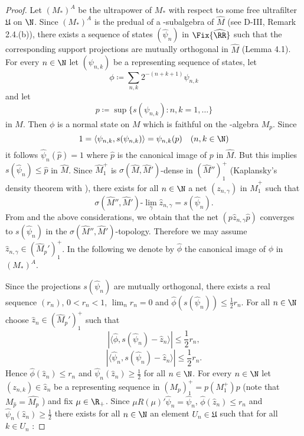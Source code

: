 \begin{proof}
Let $ (M_{*})^{A} $  be the ultrapower of $ M_{*} $  with respect to some free ultrafilter $ \mathfrak{U} $  on $ \N $.
Since $ (M_{*})^{A} $  is the predual of a \WA-subalgebra of $ \widehat{M} $  (see D-III, Remark 2.4.(b)), there exists a sequence of states $ (\hat{\psi}_{n}) $  in $ \Fix{\widehat{\RR}} $  such that the corresponding support projections are mutually orthogonal in $ \widehat{M} $  (Lemma 4.1).
For every $ n \in \N $  let $ (\psi_{n,k}) $  be a representing sequence of states, let
\[
\phi \coloneqq \sum_{n,k} 2^{-(n+k+1)} \psi_{n,k}
\]
and let
\[
p \coloneqq \sup\{s(\psi_{n,k}): n,k=1,\ldots\}
\]
in $ M $.
Then $ \phi $  is a normal state on $ M $  which is faithful on the \WA-algebra $ M_{p} $.
Since 
\[
1 = \langle\psi_{n,k},s(\psi_{n,k})\rangle = \psi_{n,k}(p) \quad (n,k \in \N)
\]
it follows $ \hat{\psi}_{n}(\hat{p}) = 1 $  where $ \hat{p} $  is the canonical image of $ p $  in $ \widehat{M} $.
%
But this implies $ s(\hat{\psi}_{n}) \leq \hat{p} $  in $ \widehat{M} $.
Since $ \widehat{M}_{1}^{+} $  is $ \sigma(\widehat{M},\widehat{M}') $-dense in $ (\widehat{M}'')_{1}^{+} $  (Kaplansky's density theorem \citet[1.9.1]{sakai:1971} with \citet[1.8.9 and 1.8.12]{sakai:1971}), there exists for all $ n \in \N $  a net $ (z_{n,\gamma}) $  in $ \widehat{M}_{1}^{+} $  such that
\[
\sigma(\widehat{M}'',\widehat{M}')\text{-}\lim_{\gamma} \hat{z}_{n,\gamma} = s(\hat{\psi}_{n}).
\]
From \citet[1.7.8]{sakai:1971} and the above considerations, we obtain that the net $ (p\hat{z}_{n,\gamma}\hat{p}) $  converges to $ s(\hat{\psi}_{n}) $  in the $ \sigma(\widehat{M}'',\widehat{M}') $-topology.
Therefore we may assume $ \hat{z}_{n,\gamma} \in (\widehat{M}_{p}')_{1}^{+} $.
In the following we denote by $ \hat{\phi} $  the canonical image of $ \phi $  in $ (M_{*})^{A} $.

Since the projections $ s(\hat{\psi}_{n}) $  are mutually orthogonal, there exists a real sequence $ (r_{n}) $, $ 0 < r_{n} < 1 $, $ \lim_{n} r_{n} = 0 $  and $ \hat{\phi}(s(\hat{\psi}_{n})) \leq \frac{1}{2}r_{n} $.
For all $ n \in \N $  choose $ \hat{z}_{n} \in (\widehat{M}_{p}')_{1}^{+} $  such that
\[
|\langle\hat{\phi},s(\hat{\psi}_{n}) - \hat{z}_{n}\rangle| \leq \frac{1}{2}r_{n},
\]
\[
|\langle\hat{\psi}_{n},s(\hat{\psi}_{n}) - \hat{z}_{n}\rangle| \leq \frac{1}{2}r_{n}.
\]
Hence $ \hat{\phi}(\hat{z}_{n}) \leq r_{n} $  and $ \hat{\psi}_{n}(\hat{z}_{n}) \geq \frac{1}{2} $  for all $ n \in \N $.
For every $ n \in \N $  let $ (z_{n,k}) \in \hat{z}_{n} $  be a representing sequence in $ (M_{p})_{1}^{+} = p(M_{1}^{+})p $  (note that $ {M}_{\hat{p}} = \widehat{M_{p}} $ ) and fix $ \mu \in \R_{+} $.
Since $ \mu R(\mu)'\hat{\psi}_{n} = \hat{\psi}_{n} $, $ \hat{\phi}(\hat{z}_{n}) \leq r_{n} $  and $ \hat{\psi}_{n}(\hat{z}_{n}) \geq \frac{1}{2} $  there exists for all $ n \in \N $  an element $ U_{n} \in \mathfrak{U} $  such that for all $ k \in U_{n} $ :


\end{proof}
